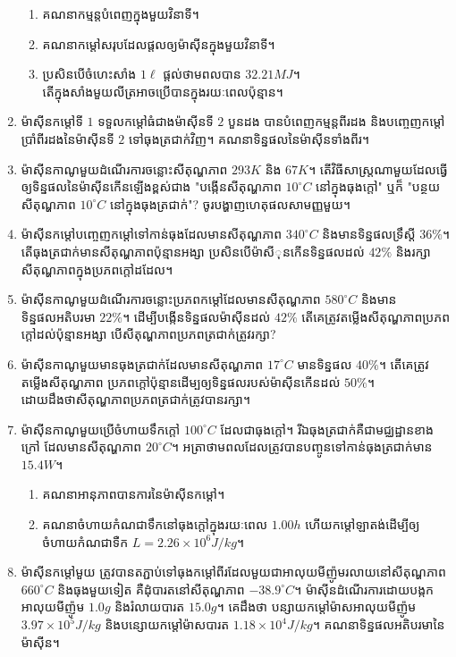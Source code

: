 \begin{enumerate}
\begin{enumerate}
			\item គណនាកម្មន្តបំពេញក្នុងមួយវិនាទី។
			\item គណនាកម្តៅសរុបដែលផ្តលឲ្យម៉ាសុីនក្នុងមួយវិនាទី។
			\item ប្រសិនបើចំហេះសាំង $1\ell$ ផ្តល់ថាមពលបាន $32.21MJ$។\\ តើក្នុងសាំងមួយលីត្រអាចប្រើបានក្នុងរយៈពេលប៉ុន្មាន។
		\end{enumerate}
		\item ម៉ាសុីនកម្តៅទី $1$ ទទួលកម្តៅធំជាងម៉ាសុីនទី $2$ បួនដង បានបំពេញកម្មន្តពីរដង និងបញ្ចេញកម្តៅប្រាំពីរដងនៃម៉ាសុីនទី $2$ ទៅធុងត្រជាក់វិញ។ គណនាទិន្នផលនៃម៉ាសុីនទាំងពីរ។
		\item ម៉ាសុីនកាណូមួយដំណើរការចន្លោះសីតុណ្ហភាព $293K$ និង $67K$។ តើវិធីសាស្រ្តណាមួយដែលធ្វើឲ្យទិន្នផលនៃម៉ាសុីនកើនឡើងខ្ពស់ជាង "បង្កើនសីតុណ្ហភាព $10^\circ C$ នៅក្នុងធុងក្តៅ" ឬក៏ "បន្ថយសីតុណ្ហភាព $10^\circ C$ នៅក្នុងធុងត្រជាក់"? ចូរបង្ហាញហេតុផលសាមញ្ញមួយ។
		\item ម៉ាសុីនកម្តៅបញ្ចេញកម្តៅទៅកាន់ធុងដែលមានសីតុណ្ហភាព $340^\circ C$ និងមានទិន្នផលទ្រឹស្តី $36\%$។ តើធុងត្រជាក់មានសីតុណ្ហភាពប៉ុន្មានអង្សា ប្រសិនបើម៉ាសីុនកើនទិន្នផលដល់ $42\%$ និងរក្សាសីតុណ្ហភាពក្នុងប្រភពក្តៅដដែល។
		\item ម៉ាសុីនកាណូមួយដំណើរការចន្លោះប្រភពកម្តៅដែលមានសីតុណ្ហភាព $580^\circ C$ និងមានទិន្នផលអតិបរមា $22\%$។ ដើម្បីបង្កើនទិន្នផលម៉ាសុីនដល់ $42\%$ តើគេត្រូវតម្លើងសីតុណ្ហភាពប្រភពក្តៅដល់ប៉ុន្មានអង្សា បើសីតុណ្ហភាពប្រភពត្រជាក់ត្រូវរក្សា?
		\item ម៉ាសុីនកាណូមួយមានធុងត្រជាក់ដែលមានសីតុណ្ហភាព $17^\circ C$ មានទិន្នផល $40\%$។ តើគេត្រូវតម្លើងសីតុណ្ហភាព ប្រភពក្តៅប៉ុន្មានដើម្បឲ្យទិន្នផលរបស់ម៉ាសុីនកើនដល់ $50\%$។\\ ដោយដឹងថាសីតុណ្ហភាពប្រភពត្រជាក់ត្រូវបានរក្សា។
		\item ម៉ាសុីនកាណូមួយប្រើចំហាយទឹកក្តៅ $100^\circ C$ ដែលជាធុងក្តៅ។ រីឯធុងត្រជាក់គឺជាមជ្ឈដ្ឋានខាងក្រៅ ដែលមានសីតុណ្ហភាព $20^\circ C$។ អត្រាថាមពលដែលត្រូវបានបញ្ចូនទៅកាន់ធុងត្រជាក់មាន $15.4W$។
		\begin{enumerate}
			\item គណនាអានុភាពបានការនៃម៉ាសុីនកម្តៅ។
			\item គណនាចំហាយកំណជាទឹកនៅធុងក្តៅក្នុងរយៈពេល $1.00h$ ហើយកម្តៅឡាតង់ដើម្បីឲ្យចំហាយកំណជាទឺក $L=2.26\times10^{6}J/kg$។
		\end{enumerate}
		\item ម៉ាសុីនកម្តៅមួយ ត្រូវបានតភ្ជាប់ទៅធុងកម្តៅពីរដែលមួយជាអាលុយមីញ៉ូមរលាយនៅសីតុណ្ហភាព $660^\circ C$ និងធុងមួយទៀត គឺដុំបារតនៅសីតុណ្ហភាព $-38.9^\circ C$។ ម៉ាសុីនដំណើរការដោយបង្កកអាលុយមីញ៉ូម $1.0g$ និងរំលាយបារត $15.0g$។ គេដឹងថា បន្សាយកម្តៅម៉ាសអាលុយមីញ៉ូម $3.97\times10^{5}J/kg$ និងបន្សោយកម្តៅម៉ាសបារត $1.18\times10^{4}J/kg$។ គណនាទិន្នផលអតិបរមានៃម៉ាសុីន។

\end{enumerate}
